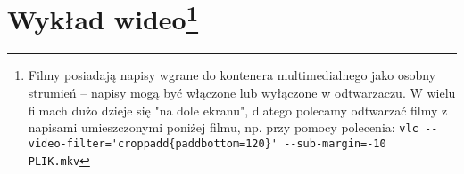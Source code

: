 \section{Wykład wideo\protect\footnote{
	Filmy posiadają napisy wgrane do kontenera multimedialnego jako osobny strumień – napisy mogą być włączone lub wyłączone w odtwarzaczu.
	W wielu filmach dużo dzieje się "na dole ekranu", dlatego polecamy odtwarzać filmy z napisami umieszczonymi poniżej filmu, np. przy pomocy polecenia:
		\Verb$vlc --video-filter='croppadd{paddbottom=120}' --sub-margin=-10  PLIK.mkv$
}}
